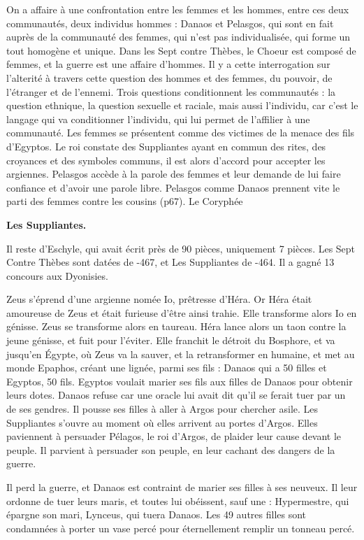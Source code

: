 \documentclass[11pt]{article}
\begin{document}
On a affaire à une confrontation entre les femmes et les hommes, entre ces deux communautés, deux individus hommes : Danaos et Pelasgos, qui sont en fait auprès de la communauté des femmes, qui n'est pas individualisée, qui forme un tout homogène et unique. Dans les Sept contre Thèbes, le Choeur est composé de femmes, et la guerre est une affaire d'hommes. Il y a cette interrogation sur l'alterité à travers cette question des hommes et des femmes, du pouvoir, de l'étranger et de l'ennemi.
Trois questions conditionnent les communautés : la question ethnique, la question sexuelle et raciale, mais aussi l'individu, car c'est le langage qui va conditionner l'individu, qui lui permet de l'affilier à une communauté. Les femmes se présentent comme des victimes de la menace des fils d'Egyptos.
Le roi constate des Suppliantes ayant en commun des rites, des croyances et des symboles communs, il est alors d'accord pour accepter les argiennes. Pelasgos accède à la parole des femmes et leur demande de lui faire confiance et d'avoir une parole libre. Pelasgos comme Danaos prennent vite le parti des femmes contre les cousins (p67). Le Coryphée 

\bf{Les Suppliantes.}

Il reste d'Eschyle, qui avait écrit près de 90 pièces, uniquement 7 pièces. Les Sept Contre Thèbes sont datées de -467, et Les Suppliantes de -464. Il a gagné 13 concours aux Dyonisies.

Zeus s'éprend d'une argienne nomée Io, prêtresse d'Héra. Or Héra était amoureuse de Zeus et était furieuse d'être ainsi trahie. Elle transforme alors Io en génisse. Zeus se transforme alors en taureau. Héra lance alors un taon contre la jeune génisse, et fuit pour l'éviter. Elle franchit le détroit du Bosphore, et va jusqu'en Égypte, où Zeus va la sauver, et la retransformer en humaine, et met au monde Epaphos, créant une lignée, parmi ses fils : Danaos qui a 50 filles et Egyptos, 50 fils. Egyptos voulait marier ses fils aux filles de Danaos pour obtenir leurs dotes. Danaos refuse car une oracle lui avait dit qu'il se ferait tuer par un de ses gendres. Il pousse ses filles à aller à Argos pour chercher asile. Les Suppliantes s'ouvre au moment où elles arrivent au portes d'Argos. Elles paviennent à persuader Pélagos, le roi d'Argos, de plaider leur cause devant le peuple. Il parvient à persuader son peuple, en leur cachant des dangers de la guerre.

Il perd la guerre, et Danaos est contraint de marier ses filles à ses neuveux. Il leur ordonne de tuer leurs maris, et toutes lui obéissent, sauf une : Hypermestre, qui épargne son mari, Lynceus, qui tuera Danaos. Les 49 autres filles sont condamnées à porter un vase percé pour éternellement remplir un tonneau percé.
\end{document}

